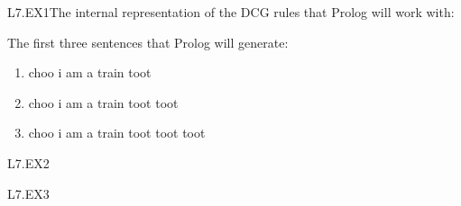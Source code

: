 \begin{mozartANSWER}{L7.EX1}The internal representation of the DCG rules that Prolog will work with: \mozartEMPTY
\begin{mozartCODEDISPLAY}\end{mozartCODEDISPLAY}
 \mozartEMPTY
The first three sentences that Prolog will generate: \mozartEMPTY
\begin{enumerate}
\item{}choo i am a train toot
\item{}choo i am a train toot toot
\item{}choo i am a train toot toot toot
\end{enumerate}
\end{mozartANSWER}
\begin{mozartANSWER}{L7.EX2}\begin{mozartCODEDISPLAY}\end{mozartCODEDISPLAY}
\end{mozartANSWER}
\begin{mozartANSWER}{L7.EX3}\begin{mozartCODEDISPLAY}\end{mozartCODEDISPLAY}
\end{mozartANSWER}

